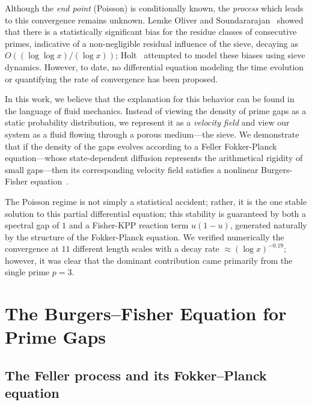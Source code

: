 \documentclass[11pt, a4paper]{amsart}
\theoremstyle{plain}
\theoremstyle{definition}
\begin{document}
Although the \emph{end point} (Poisson) is conditionally known, the \emph{process} which leads to this convergence remains unknown. 
Lemke Oliver and Soundararajan~\cite{LO2016} showed that there is a statistically significant bias for the residue classes of consecutive primes, 
indicative of a non-negligible residual influence of the sieve, decaying as $O((\log \log x)/(\log x))$; Holt~\cite{Holt2024} attempted to 
model these biases using sieve dynamics. However, to date, no differential equation modeling the time evolution or quantifying the rate of 
convergence has been proposed.

In this work, we believe that the explanation for this behavior can be found in the language of fluid mechanics. Instead of viewing the density of 
prime gaps as a static probability distribution, we represent it as a \emph{velocity field} and view our system as a fluid flowing through a porous 
medium---the sieve. We demonstrate that if the density of the gaps evolves according to a Feller Fokker-Planck equation---whose state-dependent diffusion 
represents the arithmetical rigidity of small gaps---then its corresponding velocity field satisfies a nonlinear Burgers-Fisher 
equation~\cite{Fisher1937,KPP1937}.

The Poisson regime is not simply a statistical accident; rather, it is the one stable solution to this partial differential equation; 
this stability is guaranteed by both a spectral gap of $1$ and a Fisher-KPP reaction term $u(1-u)$, generated naturally by the structure of 
the Fokker-Planck equation. We verified numerically the convergence at $11$ different length scales with a decay rate $\approx (\log x)^{-0.19}$; 
however, it was clear that the dominant contribution came primarily from the single prime $p=3$.

\section{The Burgers--Fisher Equation for Prime Gaps}
\label{sec:equation}

\subsection{The Feller process and its Fokker--Planck equation}
\end{document}
